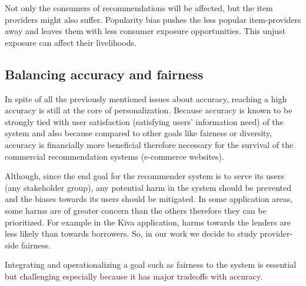 Not only the consumers of recommendations will be affected, but the item providers might also suffer. Popularity bias pushes the less popular item-providers away and leaves them with less consumer exposure opportunities. This unjust exposure can affect their livelihoods.


\subsection{Balancing accuracy and fairness}

In spite of all the previously mentioned issues about accuracy, reaching a high accuracy is still at the core of personalization. Because accuracy is known to be strongly tied with user satisfaction (satisfying users' information need) of the system and also because compared to other goals like fairness or diversity, accuracy is financially more beneficial therefore necessary for the survival of the commercial recommendation systems (e-commerce websites).

Although, since the end goal for the recommender system is to serve its users (any stakeholder group), any potential harm in the system should be prevented and the biases towards its users should be mitigated. In some application areas, some harms are of greater concern than the others therefore they can be prioritized. For example in the Kiva application, harms towards the lenders are less likely than towards borrowers. So, in our work we decide to study provider-side fairness.

Integrating and operationalizing a goal such as fairness to the system is essential but challenging especially because it has major tradeoffs with accuracy.



